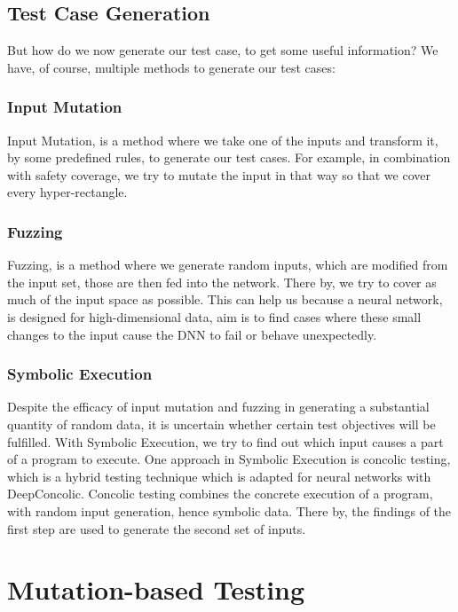 \subsection{Test Case Generation}
But how do we now generate our test case, to get some useful information?
We have, of course, multiple methods to generate our test cases:

\subsubsection{Input Mutation}
Input Mutation, is a method where we take one of the inputs and transform it, by some predefined rules, to generate our test cases.
For example, in combination with safety coverage, we try to mutate the input in that way so that we cover every hyper-rectangle.
\subsubsection{Fuzzing}
Fuzzing, is a method where we generate random inputs, which are modified from the input set, those are then fed into the network.
There by, we try to cover as much of the input space as possible.
This can help us because a neural network, is designed for high-dimensional data, aim is to find cases where these small changes to the input cause the DNN to fail or behave unexpectedly.

\subsubsection{Symbolic Execution}
Despite the efficacy of input mutation and fuzzing in generating a substantial quantity of random data, it is uncertain whether certain test objectives will be fulfilled.
With Symbolic Execution, we try to find out which input causes a part of a program to execute.
One approach in Symbolic Execution is concolic testing, which is a hybrid testing technique which is adapted for neural networks with DeepConcolic.
Concolic testing combines the concrete execution of a program, with random input generation, hence symbolic data.
There by, the findings of the first step are used to generate the second set of inputs.
\section{Mutation-based Testing}\label{sec:mutation-based-testing}


